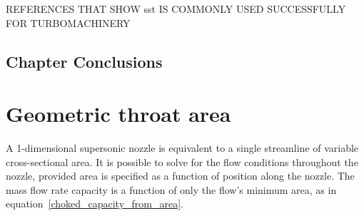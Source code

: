 \documentclass[a4paper, 11pt, oneside]{report}
\begin{document}
REFERENCES THAT SHOW sst IS COMMONLY USED SUCCESSFULLY FOR TURBOMACHINERY



\section{Chapter Conclusions}



\chapter{Geometric throat area}
\label{chapter_geometric_throat_area}





A 1-dimensional supersonic nozzle is equivalent to a single streamline of variable cross-sectional area. It is possible to solve for the flow conditions throughout the nozzle, provided area is specified as a function of position along the nozzle. The mass flow rate capacity is a function of only the flow's minimum area, as in equation~\ref{choked_capacity_from_area}.
\end{document}
